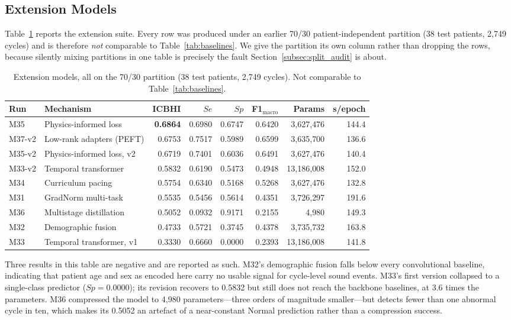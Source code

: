 \documentclass[journal,onecolumn]{IEEEtran}
\newcommand{\best}[1]{\textbf{#1}}
\begin{document}
\subsection{Extension Models}
\label{subsec:novelty}

Table~\ref{tab:novelty} reports the extension suite. Every row was produced under an
earlier 70/30 patient-independent partition (38 test patients, 2{,}749 cycles) and is
therefore \emph{not} comparable to Table~\ref{tab:baselines}. We give the partition
its own column rather than dropping the rows, because silently mixing partitions in
one table is precisely the fault Section~\ref{subsec:split_audit} is about.

\begin{table}[!t]
\centering
\caption{Extension models, all on the 70/30 partition (38 test patients, 2{,}749
cycles). Not comparable to Table~\ref{tab:baselines}.}
\label{tab:novelty}
\begin{tabular}{llrrrrrr}
\toprule
Run & Mechanism & ICBHI & $Se$ & $Sp$ & F1$_{\text{macro}}$ & Params & s/epoch \\
\midrule
M35    & Physics-informed loss      & \best{0.6864} & 0.6980 & 0.6747 & 0.6420 & 3{,}627{,}476  & 144.4 \\
M37-v2 & Low-rank adapters (PEFT)   & 0.6753 & 0.7517 & 0.5989 & 0.6599 & 3{,}635{,}700  & 136.6 \\
M35-v2 & Physics-informed loss, v2  & 0.6719 & 0.7401 & 0.6036 & 0.6491 & 3{,}627{,}476  & 140.4 \\
M33-v2 & Temporal transformer       & 0.5832 & 0.6190 & 0.5473 & 0.4948 & 13{,}186{,}008 & 152.0 \\
M34    & Curriculum pacing          & 0.5754 & 0.6340 & 0.5168 & 0.5268 & 3{,}627{,}476  & 132.8 \\
M31    & GradNorm multi-task        & 0.5535 & 0.5456 & 0.5614 & 0.4351 & 3{,}726{,}297  & 191.6 \\
M36    & Multistage distillation    & 0.5052 & 0.0932 & 0.9171 & 0.2155 & 4{,}980        & 149.3 \\
M32    & Demographic fusion         & 0.4733 & 0.5721 & 0.3745 & 0.4378 & 3{,}735{,}732  & 163.8 \\
M33    & Temporal transformer, v1   & 0.3330 & 0.6660 & 0.0000 & 0.2393 & 13{,}186{,}008 & 141.8 \\
\bottomrule
\end{tabular}
\end{table}

Three results in this table are negative and are reported as such. M32's demographic
fusion falls below every convolutional baseline, indicating that patient age and sex
as encoded here carry no usable signal for cycle-level sound events. M33's first
version collapsed to a single-class predictor ($Sp = 0.0000$); its revision recovers
to 0.5832 but still does not reach the backbone baselines, at 3.6 times the
parameters. M36 compressed the model to 4{,}980 parameters---three orders of
magnitude smaller---but detects fewer than one abnormal cycle in ten, which makes its
0.5052 an artefact of a near-constant Normal prediction rather than a compression
success.
\end{document}
